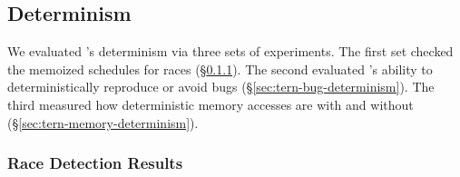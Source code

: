 

\subsection{Determinism}\label{sec:tern-determinism}

We evaluated \tern's determinism via three sets of experiments.  The first
set checked the memoized schedules for races (\S\ref{sec:tern-race-results}).
The second evaluated \tern's ability to deterministically reproduce or avoid
bugs (\S\ref{sec:tern-bug-determinism}).  The third measured how deterministic
memory accesses are with and without
\tern (\S\ref{sec:tern-memory-determinism}).

\subsubsection{Race Detection Results}\label{sec:tern-race-results}

